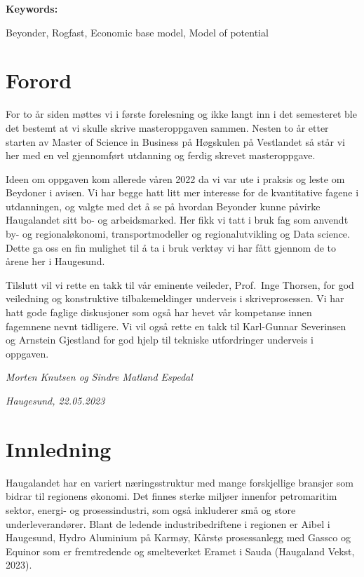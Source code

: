 \documentclass[
]{article}
\begin{document}
\textbf{Keywords:}

Beyonder, Rogfast, Economic base model, Model of potential

\newpage

\hypertarget{forord}{%
\section*{Forord}\label{forord}}

For to år siden møttes vi i første forelesning og ikke langt inn i det
semesteret ble det bestemt at vi skulle skrive masteroppgaven sammen.
Nesten to år etter starten av Master of Science in Business på Høgskulen
på Vestlandet så står vi her med en vel gjennomført utdanning og ferdig
skrevet masteroppgave.

Ideen om oppgaven kom allerede våren 2022 da vi var ute i praksis og
leste om Beydoner i avisen. Vi har begge hatt litt mer interesse for de
kvantitative fagene i utdanningen, og valgte med det å se på hvordan
Beyonder kunne påvirke Haugalandet sitt bo- og arbeidsmarked. Her fikk
vi tatt i bruk fag som anvendt by- og regionaløkonomi, transportmodeller
og regionalutvikling og Data science. Dette ga oss en fin mulighet til å
ta i bruk verktøy vi har fått gjennom de to årene her i Haugesund.

Tilslutt vil vi rette en takk til vår eminente veileder, Prof.~Inge
Thorsen, for god veiledning og konstruktive tilbakemeldinger underveis i
skriveprosessen. Vi har hatt gode faglige diskusjoner som også har hevet
vår kompetanse innen fagemnene nevnt tidligere. Vi vil også rette en
takk til Karl-Gunnar Severinsen og Arnstein Gjestland for god hjelp til
tekniske utfordringer underveis i oppgaven.

\emph{Morten Knutsen og Sindre Matland Espedal}

\emph{Haugesund, 22.05.2023}

\newpage
\tableofcontents

\newpage
\listoffigures

\newpage
\listoftables

\newpage
{}

\hypertarget{innledning}{%
\section{Innledning}\label{innledning}}

Haugalandet har en variert næringsstruktur med mange forskjellige
bransjer som bidrar til regionens økonomi. Det finnes sterke miljøer
innenfor petromaritim sektor, energi- og prosessindustri, som også
inkluderer små og store underleverandører. Blant de ledende
industribedriftene i regionen er Aibel i Haugesund, Hydro Aluminium på
Karmøy, Kårstø prosessanlegg med Gassco og Equinor som er fremtredende
og smelteverket Eramet i Sauda (Haugaland Vekst, 2023).
\end{document}
